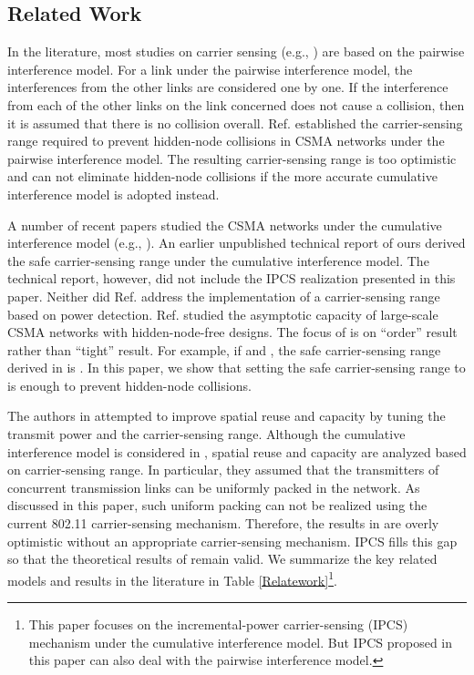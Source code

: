 \documentclass[conference]{IEEEtran}
\begin{document}
\subsection{Related Work}\label{relatedwork}




In the literature, most studies on carrier sensing (e.g.,
\cite{KXu,LiBin,PCNg,libinhdfvcs,SXu,Vasan}) are based on the
pairwise interference model. For a link under the pairwise
interference model, the interferences from the other links are
considered one by one. If the interference from each of the other
links on the link concerned does not cause a collision, then it is
assumed that there is no collision overall. Ref. \cite{LiBin}
established the carrier-sensing range required to prevent
hidden-node collisions in CSMA networks under the pairwise
interference model. The resulting carrier-sensing range is too
optimistic and can not eliminate hidden-node collisions if the more
accurate cumulative interference model is adopted instead.

A number of recent papers studied the CSMA networks under the
cumulative interference model (e.g.,
\cite{chichau,TaeSuk,TingYu,Liqun}). An earlier unpublished
technical report of ours \cite{Liqun} derived the safe
carrier-sensing range under the cumulative interference model. The
technical report, however, did not include the IPCS realization
presented in this paper. Neither did Ref.
\cite{chichau,TaeSuk,TingYu} address the implementation of a
carrier-sensing range based on power detection. Ref. \cite{chichau}
studied the asymptotic capacity of large-scale CSMA networks with
hidden-node-free designs. The focus of \cite{chichau} is on
``order'' result rather than ``tight'' result. For example, if
 and , the safe carrier-sensing range
derived in \cite{chichau} is . In this paper, we show
that setting the safe carrier-sensing range to  is
enough to prevent hidden-node collisions.

The authors in \cite{TaeSuk,TingYu} attempted to improve spatial
reuse and capacity by tuning the transmit power and the
carrier-sensing range. Although the cumulative interference model is
considered in \cite{TaeSuk,TingYu}, spatial reuse and capacity are
analyzed based on carrier-sensing range. In particular, they assumed
that the transmitters of concurrent transmission links can be
uniformly packed in the network. As discussed in this paper, such
uniform packing can not be realized using the current 802.11
carrier-sensing mechanism. Therefore, the results in
\cite{TaeSuk,TingYu} are overly optimistic without an appropriate
carrier-sensing mechanism. IPCS f\/ills this gap so that the
theoretical results of \cite{TaeSuk,TingYu} remain valid. We
summarize the key related models and results in the literature in
Table \ref{Relatework}\footnote{This paper focuses on the
incremental-power carrier-sensing (IPCS) mechanism under the
cumulative interference model. But IPCS proposed in this paper can
also deal with the pairwise interference model.}.
\end{document}
